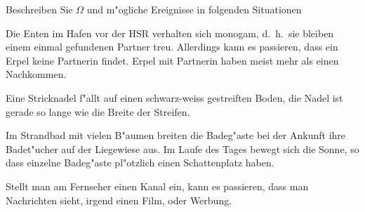 Beschreiben Sie $\Omega$ und m"ogliche Ereignisse in folgenden Situationen
\begin{teilaufgaben}
\item
Die Enten im Hafen vor der HSR verhalten sich monogam, d.~h.~sie bleiben einem
einmal gefundenen Partner treu. Allerdings kann es passieren, dass ein
Erpel keine Partnerin findet. Erpel mit Partnerin haben meist mehr
als einen Nachkommen.
\item
Eine Stricknadel f"allt auf einen schwarz-weiss gestreiften Boden, die
Nadel ist gerade so lange wie die Breite der Streifen.
\item
Im Strandbad mit vielen B"aumen breiten die Badeg"aste bei der Ankunft
ihre Badet"ucher auf der Liegewiese aus.
Im Laufe des Tages bewegt sich die Sonne, so dass
einzelne Badeg"aste pl"otzlich einen Schattenplatz haben.
\item
Stellt man am Fernseher einen Kanal ein, kann es passieren, dass
man Nachrichten sieht, irgend einen Film, oder Werbung.
\end{teilaufgaben}

